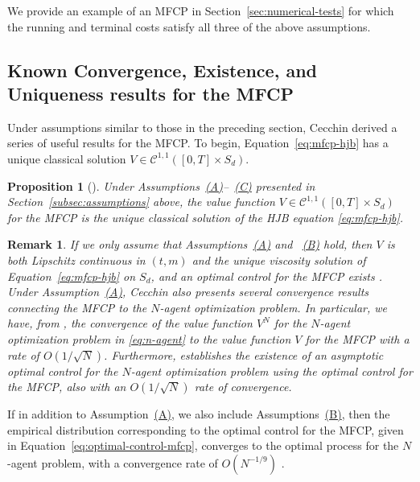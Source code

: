 \documentclass[11pt,reqno]{amsart}
\numberwithin{equation}{section}
\theoremstyle{plain}
\newtheorem{proposition}[theorem]{Proposition}
\newtheorem{remark}[theorem]{Remark}
\newcommand{\sC}{\mathcal{C}}
\begin{document}
We provide an example of an MFCP in Section~\ref{sec:numerical-tests} for which the running and terminal costs satisfy all three of the above assumptions.
\subsection{Known Convergence, Existence, and Uniqueness results for the MFCP}
\label{subsec:prev-results}
Under assumptions similar to those in the preceding section, Cecchin \cite{mfcp} derived a series of useful results for the MFCP. To begin, Equation~\eqref{eq:mfcp-hjb} has a unique classical solution $V \in \sC^{1,1}([0,T] \times S_d)$.
\begin{proposition}[{{\cite[Theorem 2.9(3)]{mfcp}}}]
\label{prop:mfcp-hjb}
Under Assumptions~\hyperref[a:mfcp-A]{(A)}--~\hyperref[a:mfcp-C]{(C)} presented in Section~\ref{subsec:assumptions} above, the value function $V \in \sC^{1,1}([0, T] \times S_d)$ for the MFCP is the unique classical solution of the HJB equation \eqref{eq:mfcp-hjb}.
\end{proposition}

\begin{remark}
    If we only assume that Assumptions~\hyperref[a:mfcp-A]{(A)} and ~\hyperref[a:mfcp-B]{(B)} hold, then $V$ is both Lipschitz continuous in $(t, m)$ and the unique viscosity solution of Equation~\eqref{eq:mfcp-hjb} on $S_d$, and an optimal control for the MFCP exists \cite[Theorem 2.9(2)]{mfcp}. Under Assumption~\hyperref[a:mfcp-A]{(A)}, Cecchin also presents several convergence results connecting the MFCP to the $N$-agent optimization problem. In particular, we have, from \cite[Theorem 2.10]{mfcp}, the convergence of the value function $V^N$ for the $N$-agent optimization problem in \eqref{eq:n-agent} to the value function $V$ for the MFCP with a rate of $O(1/\sqrt{N})$.  Furthermore, \cite[Theorem 2.11]{mfcp} establishes the existence of an asymptotic optimal control for the $N$-agent optimization problem using the optimal control for the MFCP, also with an $O(1/\sqrt{N})$ rate of convergence.
\end{remark}

If in addition to Assumption~\hyperref[a:mfcp-A]{(A)}, we also include Assumptions~\hyperref[a:mfcp-B]{(B)}, then the empirical distribution corresponding to the optimal control for the MFCP, given in Equation~\eqref{eq:optimal-control-mfcp}, converges to the optimal process for the $N$-agent problem, with a convergence rate of $O(N^{-1/9})$ \cite[Theorem 2.13]{mfcp}.
\end{document}
